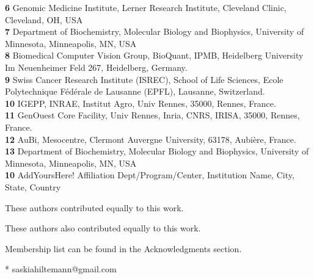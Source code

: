 \documentclass[10pt,letterpaper]{article}
\begin{document}
\begin{flushleft}
\textbf{6} Genomic Medicine Institute, Lerner Research Institute, Cleveland Clinic, Cleveland, OH, USA  \\
\textbf{7} Department of Biochemistry, Molecular Biology and Biophysics, University of Minnesota, Minneapolis, MN, USA  \\
\textbf{8} Biomedical Computer Vision Group, BioQuant, IPMB, Heidelberg University\\ Im Neuenheimer Feld 267, Heidelberg, Germany. \\
\textbf{9} Swiss Cancer Research Institute (ISREC), School of Life Sciences, Ecole Polytechnique Fédérale de Lausanne (EPFL), Lausanne, Switzerland. \\
\textbf{10} IGEPP, INRAE, Institut Agro, Univ Rennes, 35000, Rennes, France.\\
\textbf{11} GenOuest Core Facility, Univ Rennes, Inria, CNRS, IRISA, 35000, Rennes, France.\\
\textbf{12} AuBi, Mesocentre, Clermont Auvergne University, 63178, Aubière, France.\\
\textbf{13} Department of Biochemistry, Molecular Biology and Biophysics, University of Minnesota, Minneapolis, MN, USA  \\
\color{blue}\textbf{10} AddYoursHere! Affiliation Dept/Program/Center, Institution Name, City, State, Country \color{black}\\
\bigskip

%
%
\Yinyang These authors contributed equally to this work.

\ddag These authors also contributed equally to this work.



\textpilcrow Membership list can be found in the Acknowledgments section.

* saskiahiltemann@gmail.com

\end{flushleft}
\end{document}
